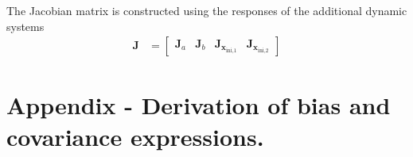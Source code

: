 The Jacobian matrix is constructed using the responses of the additional dynamic systems  
\begin{equation} \begin{aligned} \mathbf{J} &= \begin{bmatrix} \mathbf{J}_a & \mathbf{J}_b & \mathbf{J}_{\mathbf{x}_{\text{ini,1}}} & \mathbf{J}_{\mathbf{x}_{\text{ini,2}}} \end{bmatrix} \end{aligned} \end{equation}




\section{Appendix - Derivation of bias and covariance expressions.}

